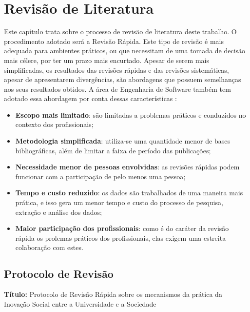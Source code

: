 \chapter{Revisão de Literatura}
\label{chap:revisao}

Este capítulo trata sobre o processo de revisão de literatura deste trabalho. O procedimento adotado será a Revisão Rápida. Este tipo de revisão é mais adequada para ambientes práticos, ou que necessitam de uma tomada de decisão mais célere, por ter um prazo mais encurtado. Apesar de serem mais simplificadas, os resultados das revisões rápidas e das revisões sistemáticas, apesar de apresentarem divergências, são abordagens que possuem semelhanças nos seus resultados obtidos. A área de Engenharia de Software também tem adotado essa abordagem por conta dessas características \cite{cartaxo2020}:

\begin{itemize}
    \item \textbf{Escopo mais limitado}: são limitadas a problemas práticos e conduzidos no contexto dos profissionais;
    \item \textbf{Metodologia simplificada}: utiliza-se uma quantidade menor de bases bibliográficas, além de limitar a faixa de período das publicações;
    \item \textbf{Necessidade menor de pessoas envolvidas}: as revisões rápidas podem funcionar com a participação de pelo menos uma pessoa;
    \item \textbf{Tempo e custo reduzido}: os dados são trabalhados de uma maneira mais prática, e isso gera um menor tempo e custo do processo de pesquisa, extração e análise dos dados;
    \item \textbf{Maior participação dos profissionais}: como é do caráter da revisão rápida os prolemas práticos dos profissionais, elas exigem uma estreita colaboração com estes.
\end{itemize}

\section{Protocolo de Revisão}
\textbf{Título:} Protocolo de Revisão Rápida sobre os mecanismos da prática da Inovação Social entre a Universidade e a Sociedade

\par\vspace{3\baselineskip}

